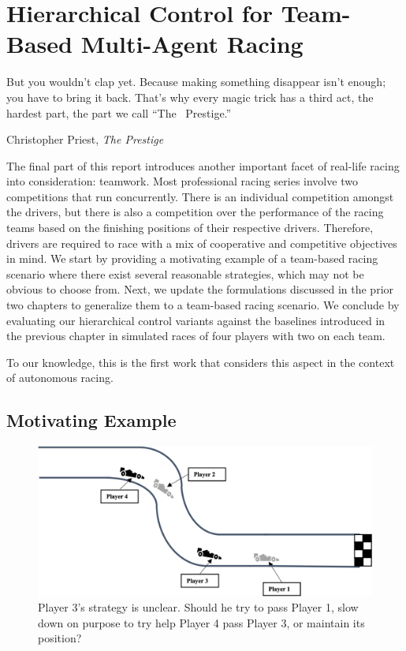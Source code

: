 \chapter{Hierarchical Control for Team-Based Multi-Agent Racing}
\epigraph{\flushright But you wouldn't clap yet. Because making something disappear isn't enough; you have to bring it back. That's why every magic trick has a third act, the hardest part, the part we call ``The~ Prestige.''}{Christopher Priest, \textit{The Prestige}}
\label{chapter:team}
The final part of this report introduces another important facet of real-life racing into consideration: teamwork. Most professional racing series involve two competitions that run concurrently. There is an individual competition amongst the drivers, but there is also a competition over the performance of the racing teams based on the finishing positions of their respective drivers. Therefore, drivers are required to race with a mix of cooperative and competitive objectives in mind. We start by providing a motivating example of a team-based racing scenario where there exist several reasonable strategies, which may not be obvious to choose from. Next, we update the formulations discussed in the prior two chapters to generalize them to a team-based racing scenario. We conclude by evaluating our hierarchical control variants against the baselines introduced in the previous chapter in simulated races of four players with two on each team.

To our knowledge, this is the first work that considers this aspect in the context of autonomous racing. 

\section{Motivating Example}
\begin{figure}
  \centering
  \includegraphics[width=\textwidth]{Figures/TeamMotiv.png}
  \caption[Motivating example for team-based racing] {Player 3's strategy is unclear. Should he try to pass Player 1, slow down on purpose to try help Player 4 pass Player 3, or maintain its position?}
  \label{fig:team_motivating}
\end{figure}

